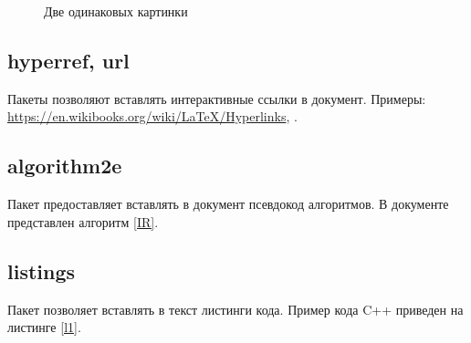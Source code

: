 \begin{figure}[b]
  \centering
  \qquad
  \caption{Две одинаковых картинки}
  \label{2figs}
\end{figure}

\subsection{hyperref, url}
Пакеты позволяют вставлять интерактивные ссылки в документ.
Примеры: 
\url{https://en.wikibooks.org/wiki/LaTeX/Hyperlinks},
\hyperlink{contents}{\contentsname}.

\subsection{algorithm2e}
Пакет предоставляет вставлять в документ псевдокод алгоритмов.
В документе представлен алгоритм \ref{IR}.


\subsection{listings}
Пакет позволяет вставлять в текст листинги кода.
Пример кода C++ приведен на листинге \ref{l1}.

